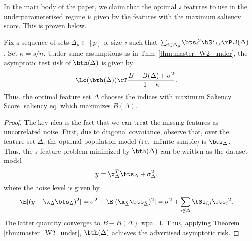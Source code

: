In the main body of the paper, we claim that the optimal $s$ features to use in the underparameterized regime is given by the features with the maximum saliency score. This is proven below.
\begin{lemma}\label{lem best s} Fix a sequence of sets $\Delta_p\subset[p]$ of size $s$ such that $\sum_{i\in \Delta_p} {\bts_i}^2\bSi_{i,i}\rP B(\Delta)$. Set $\kappa=s/n$. Under same assumptions as in Thm~\ref{thm:master_W2_under}, the asymptotic test risk of $\bth(\Delta)$ is given by
\[
\Lc(\bth(\Delta))\rP \frac{B-B(\Delta)+\sigma^2}{1-\kappa}.
\]
Thus, the optimal feature set $\Delta$ chooses the indices with maximum Saliency Score \eqref{saliency eq} which maximizes $B(\Delta)$.
\end{lemma}
\begin{proof} The key idea is the fact that we can treat the missing features as uncorrelated noise. First, due to diagonal covariance, observe that, over the feature set $\Delta$, the optimal population model (i.e.~infinite sample) is $\bts_{\Delta}$. Thus, the $s$ feature problem minimized by $\bth(\Delta)$ can be written as the dataset model
\[
y=\x_{\Delta}^T\bts_{\Delta}+\sigma_{\Delta}^2,
\]
where the noise level is given by
\[
\E[(y-\x_{\Delta}\bts_{\Delta})^2]=\sigma^2+\E[(\x_{\bar{\Delta}}\bts_{\bar{\Delta}})^2]=\sigma^2+\sum_{i\not\in\Delta}\bSi_{i,i}{\bts_{i}}^2.
\]
The latter quantity converges to $B-B(\Delta)$ wpa.~1. Thus, applying Theorem \ref{thm:master_W2_under}, $\bth(\Delta)$ achieves the advertised asymptotic risk. 
\end{proof}


